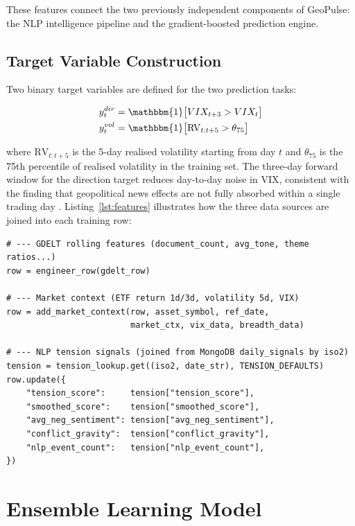 \documentclass[12pt,a4paper]{report}
\begin{document}
These features connect the two previously independent components of
GeoPulse: the NLP intelligence pipeline and the gradient-boosted
prediction engine.

\subsection{Target Variable Construction}

Two binary target variables are defined for the two prediction tasks:

\begin{align}
  y^{dir}_t   &= \mathbbm{1}\bigl[VIX_{t+3} > VIX_t\bigr]
  \label{eq:target_dir} \\
  y^{vol}_t   &= \mathbbm{1}\bigl[\text{RV}_{t:t+5} > \theta_{75}\bigr]
  \label{eq:target_vol}
\end{align}

\noindent where $\text{RV}_{t:t+5}$ is the 5-day realised volatility
starting from day $t$ and $\theta_{75}$ is the 75th percentile of realised
volatility in the training set. The three-day forward window for the
direction target reduces day-to-day noise in VIX, consistent with the
finding that geopolitical news effects are not fully absorbed within a
single trading day \cite{mitchell1994}. Listing~\ref{lst:features}
illustrates how the three data sources are joined into each training row:
\newpage
\begin{lstlisting}[caption={Joining GDELT, NLP tension signals, and market
  context for a single country row
  (from \texttt{ml/scripts/features/build\_training\_dataset.py}
  and \texttt{ml/scripts/models/run\_predict.py}).},
  label={lst:features}]
# --- GDELT rolling features (document_count, avg_tone, theme ratios...)
row = engineer_row(gdelt_row)

# --- Market context (ETF return 1d/3d, volatility 5d, VIX)
row = add_market_context(row, asset_symbol, ref_date,
                         market_ctx, vix_data, breadth_data)

# --- NLP tension signals (joined from MongoDB daily_signals by iso2)
tension = tension_lookup.get((iso2, date_str), TENSION_DEFAULTS)
row.update({
    "tension_score":     tension["tension_score"],
    "smoothed_score":    tension["smoothed_score"],
    "avg_neg_sentiment": tension["avg_neg_sentiment"],
    "conflict_gravity":  tension["conflict_gravity"],
    "nlp_event_count":   tension["nlp_event_count"],
})
\end{lstlisting}

\section{Ensemble Learning Model}
\end{document}
